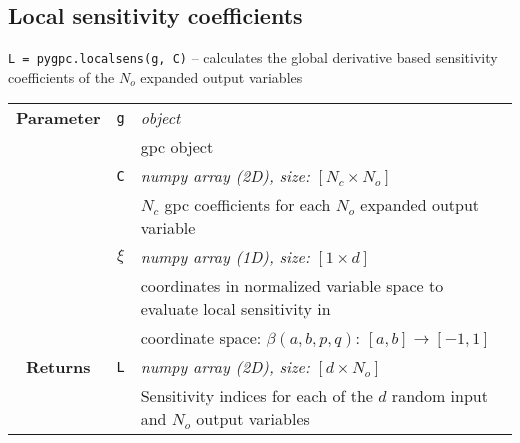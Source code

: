 \subsection{Local sensitivity coefficients}
\texttt{L = pygpc.localsens(g, C)} -- calculates the global derivative based sensitivity coefficients of the $N_o$ expanded output variables 
\renewcommand{\arraystretch}{1.3}

\begin{tabular}{c c l}
	\hline
	\textbf{Parameter} & \texttt{g} & \textit{object}                                                                 \\
	                   &            & gpc object                                                                      \\
	                   & \texttt{C} & \textit{numpy array (2D), size:} $[N_c \times N_o]$                             \\
	                   &            & $N_c$ gpc coefficients for each $N_o$ expanded output variable                  \\
	                   & $\xi$      & \textit{numpy array (1D), size:} $[1 \times d]$                                 \\
	                   &            & coordinates in normalized variable space to evaluate local sensitivity in                  \\
	                   &            & coordinate space: $\beta(a,b,p,q)$: $[a,b]\rightarrow[-1,1]$                  \\ \hline
	 \textbf{Returns}  & \texttt{L} & \textit{numpy array (2D), size:} $[d \times N_o]$                               \\
	                   &            & Sensitivity indices for each of the $d$ random input and $N_o$ output variables
\end{tabular} 
